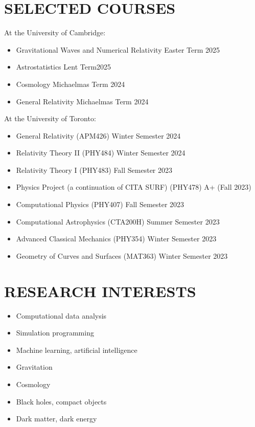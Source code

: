 \documentclass[a4paper,10pt]{extarticle}
\begin{document}
\section*{SELECTED COURSES}
At the University of Cambridge:
\begin{itemize}
    \item Gravitational Waves and Numerical Relativity \hfill Easter Term 2025

    \item Astrostatistics \hfill Lent Term2025

    \item Cosmology \hfill Michaelmas Term 2024

    \item General Relativity \hfill Michaelmas Term 2024
\end{itemize}

At the University of Toronto:
\begin{itemize}
    \item General Relativity (APM426) \hfill Winter Semester 2024
    
    \item Relativity Theory II (PHY484) \hfill Winter Semester 2024

    \item Relativity Theory I (PHY483) \hfill Fall Semester 2023

    \item Physics Project (a continuation of CITA SURF) (PHY478) \hfill A+ (Fall 2023)

    \item Computational Physics (PHY407) \hfill Fall Semester 2023

    \item Computational Astrophysics (CTA200H) \hfill Summer Semester 2023

    \item Advanced Classical Mechanics (PHY354) \hfill Winter Semester 2023

    \item Geometry of Curves and Surfaces (MAT363) \hfill Winter Semester 2023
\end{itemize}

\newpage
\section*{RESEARCH INTERESTS}
\begin{itemize}
    \item Computational data analysis

    \item Simulation programming

    \item Machine learning, artificial intelligence
    
    \item Gravitation

    \item Cosmology

    \item Black holes, compact objects

    \item Dark matter, dark energy
\end{itemize}
\end{document}
